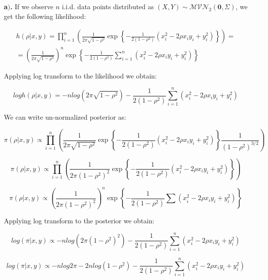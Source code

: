 \documentclass[a4 paper]{article}
\begin{document}
	







\textbf{a$)$.} If we observe $n$ i.i.d. data points
distributed as $(X, Y) \sim \mathcal{M} \mathcal{V} \mathcal{N}_{2}(\mathbf{0}, \Sigma)$,
we get the following likelihood:

\begin{align*}
h(\rho|x,y)	=\prod_{i=1}^{n}\left(\frac{1}{2\pi\sqrt{1-\rho^{2}}}\exp\left\{ -\frac{1}{2\left(1-\rho^{2}\right)}\left(x_{i}^{2}-2\rho x_{i}y_{i}+y_{i}^{2}\right)\right\} \right)=\\
=	\left(\frac{1}{2\pi\sqrt{1-\rho^{2}}}\right)^{n}\exp\left\{ -\frac{1}{2\left(1-\rho^{2}\right)}\sum_{i=1}^{n}\left(x_{i}^{2}-2\rho x_{i}y_{i}+y_{i}^{2}\right)\right\} 
\end{align*}

Applying log transform to the likelihood we obtain:

$$
log h(\rho|x,y)=-nlog\left(2\pi\sqrt{1-\rho^{2}}\right)-\frac{1}{2\left(1-\rho^{2}\right)}\sum_{i=1}^{n}\left(x_{i}^{2}-2\rho x_{i}y_{i}+y_{i}^{2}\right)
$$

We can write un-normalized posterior as:

$$
\pi(\rho|x,y)\propto\prod_{i=1}^{n}\left(\frac{1}{2\pi\sqrt{1-\rho^{2}}}\exp\left\{ -\frac{1}{2\left(1-\rho^{2}\right)}\left(x_{i}^{2}-2\rho x_{i}y_{i}+y_{i}^{2}\right)\right\} \frac{1}{\left(1-\rho^{2}\right)^{3/2}}\right)
$$

$$
\pi(\rho|x,y)\propto\prod_{i=1}^{n}\left(\frac{1}{2\pi\left(1-\rho^{2}\right)^{2}}\exp\left\{ -\frac{1}{2\left(1-\rho^{2}\right)}\left(x_{i}^{2}-2\rho x_{i}y_{i}+y_{i}^{2}\right)\right\} \right)
$$

$$
\pi(\rho|x,y)\propto\left(\frac{1}{2\pi\left(1-\rho^{2}\right)^{2}}\right)^{n}\exp\left\{ -\frac{1}{2\left(1-\rho^{2}\right)}\sum\left(x_{i}^{2}-2\rho x_{i}y_{i}+y_{i}^{2}\right)\right\} 
$$


Applying log transform to the posterior we obtain:

$$
log(\pi|x,y)\propto-nlog\left(2\pi\left(1-\rho^{2}\right)^{2}\right)-\frac{1}{2\left(1-\rho^{2}\right)}\sum_{i=1}^{n}\left(x_{i}^{2}-2\rho x_{i}y_{i}+y_{i}^{2}\right)
$$

$$
log(\pi|x,y)\propto-nlog2\pi-2nlog\left(1-\rho^{2}\right)-\frac{1}{2\left(1-\rho^{2}\right)}\sum_{i=1}^{n}\left(x_{i}^{2}-2\rho x_{i}y_{i}+y_{i}^{2}\right)
$$
\end{document}

